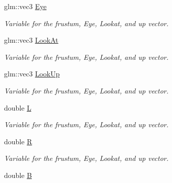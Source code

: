 {\bf }\par
\begin{DoxyCompactItemize}
\item 
glm\+::vec3 \hyperlink{classcft_1_1Scene_aeb18278aa4012ddd9785d41c8f2f0336}{Eye}\hypertarget{classcft_1_1Scene_aeb18278aa4012ddd9785d41c8f2f0336}{}\label{classcft_1_1Scene_aeb18278aa4012ddd9785d41c8f2f0336}

\begin{DoxyCompactList}\small\item\em Variable for the frustum, Eye, Lookat, and up vector. \end{DoxyCompactList}\item 
glm\+::vec3 \hyperlink{classcft_1_1Scene_ad888d51b46066721879fc553beb138d0}{Look\+At}\hypertarget{classcft_1_1Scene_ad888d51b46066721879fc553beb138d0}{}\label{classcft_1_1Scene_ad888d51b46066721879fc553beb138d0}

\begin{DoxyCompactList}\small\item\em Variable for the frustum, Eye, Lookat, and up vector. \end{DoxyCompactList}\item 
glm\+::vec3 \hyperlink{classcft_1_1Scene_aab4df259970cf4f6b87fd31d3ecd3675}{Look\+Up}\hypertarget{classcft_1_1Scene_aab4df259970cf4f6b87fd31d3ecd3675}{}\label{classcft_1_1Scene_aab4df259970cf4f6b87fd31d3ecd3675}

\begin{DoxyCompactList}\small\item\em Variable for the frustum, Eye, Lookat, and up vector. \end{DoxyCompactList}\item 
double \hyperlink{classcft_1_1Scene_a9b46bf1af33a0888509c2c8a52ea6929}{L}\hypertarget{classcft_1_1Scene_a9b46bf1af33a0888509c2c8a52ea6929}{}\label{classcft_1_1Scene_a9b46bf1af33a0888509c2c8a52ea6929}

\begin{DoxyCompactList}\small\item\em Variable for the frustum, Eye, Lookat, and up vector. \end{DoxyCompactList}\item 
double \hyperlink{classcft_1_1Scene_aaa9961bf231dcaad78516b419341e6f4}{R}\hypertarget{classcft_1_1Scene_aaa9961bf231dcaad78516b419341e6f4}{}\label{classcft_1_1Scene_aaa9961bf231dcaad78516b419341e6f4}

\begin{DoxyCompactList}\small\item\em Variable for the frustum, Eye, Lookat, and up vector. \end{DoxyCompactList}\item 
double \hyperlink{classcft_1_1Scene_a5b1e87d4c8ce27545a7277f4950b8f6d}{B}\hypertarget{classcft_1_1Scene_a5b1e87d4c8ce27545a7277f4950b8f6d}{}\label{classcft_1_1Scene_a5b1e87d4c8ce27545a7277f4950b8f6d}


\end{DoxyCompactItemize}
